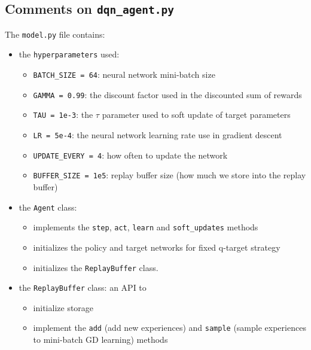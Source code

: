 \documentclass[
]{article}
\providecommand{\tightlist}{%
  \setlength{\itemsep}{0pt}\setlength{\parskip}{0pt}}
\begin{document}
\hypertarget{comments-on-dqn_agent.py}{%
\subsection{\texorpdfstring{Comments on
\texttt{dqn\_agent.py}}{Comments on dqn\_agent.py}}\label{comments-on-dqn_agent.py}}

The \texttt{model.py} file contains:

\begin{itemize}
\tightlist
\item
  the \texttt{hyperparameters} used:

  \begin{itemize}
  \tightlist
  \item
    \texttt{BATCH\_SIZE\ =\ 64}: neural network mini-batch size
  \item
    \texttt{GAMMA\ =\ 0.99}: the discount factor used in the discounted
    sum of rewards
  \item
    \texttt{TAU\ =\ 1e-3}: the \(\tau\) parameter used to soft update of
    target parameters
  \item
    \texttt{LR\ =\ 5e-4}: the neural network learning rate use in
    gradient descent
  \item
    \texttt{UPDATE\_EVERY\ =\ 4}: how often to update the network
  \item
    \texttt{BUFFER\_SIZE\ =\ 1e5}: replay buffer size (how much we store
    into the replay buffer)
  \end{itemize}
\item
  the \texttt{Agent} class:

  \begin{itemize}
  \tightlist
  \item
    implements the \texttt{step}, \texttt{act}, \texttt{learn} and
    \texttt{soft\_updates} methods
  \item
    initializes the policy and target networks for fixed q-target
    strategy
  \item
    initializes the \texttt{ReplayBuffer} class.
  \end{itemize}
\item
  the \texttt{ReplayBuffer} class: an API to

  \begin{itemize}
  \tightlist
  \item
    initialize storage
  \item
    implement the \texttt{add} (add new experiences) and \texttt{sample}
    (sample experiences to mini-batch GD learning) methods
  \end{itemize}
\end{itemize}
\end{document}

